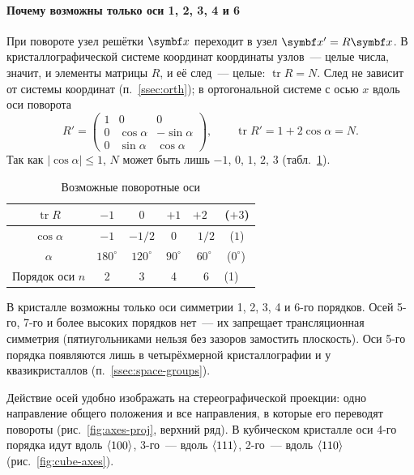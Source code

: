 \paragraph{Почему возможны только оси 1, 2, 3, 4 и 6}
При повороте узел решётки $\vb x$ переходит в узел $\vb x'=R\vb x$. В
кристаллографической системе координат координаты узлов~— целые числа,
значит, и элементы матрицы $R$, и её след~— целые: $\operatorname{tr}R=N$. След не
зависит от системы координат (п.~\ref{ssec:orth}); в ортогональной системе
с осью $x$ вдоль оси поворота
\begin{equation}\label{eq:Rx}
R'=\begin{pmatrix}1&0&0\\0&\cos\alpha&-\sin\alpha\\0&\sin\alpha&\cos\alpha\end{pmatrix},\qquad
\operatorname{tr}R'=1+2\cos\alpha=N .
\end{equation}
Так как $|\cos\alpha|\le1$, $N$ может быть лишь $-1$, $0$, $1$, $2$, $3$
(табл.~\ref{tab:axes}).

\begin{table}[ht]
\centering
\caption{Возможные поворотные оси}\label{tab:axes}
\small
\begin{tabular}{@{}ccccc@{}}
\toprule
$\operatorname{tr}R$ & $-1$ & $0$ & $+1$ & $+2$ \ \ ($+3$) \\
\midrule
$\cos\alpha$ & $-1$ & $-1/2$ & $0$ & $1/2$ \ \ ($1$) \\
$\alpha$ & $180^\circ$ & $120^\circ$ & $90^\circ$ & $60^\circ$ \ \ ($0^\circ$) \\
Порядок оси $n$ & 2 & 3 & 4 & 6 \ \ (1) \\
\bottomrule
\end{tabular}
\end{table}

\begin{glavnoe}
В кристалле возможны только оси симметрии 1, 2, 3, 4 и 6-го порядков.
Осей 5-го, 7-го и более высоких порядков нет~— их запрещает
трансляционная симметрия (пятиугольниками нельзя без зазоров замостить
плоскость). Оси 5-го порядка появляются лишь в четырёхмерной
кристаллографии и у квазикристаллов (п.~\ref{ssec:space-groups}).
\end{glavnoe}

Действие осей удобно изображать на стереографической проекции: одно
направление общего положения и все направления, в которые его
переводят повороты (рис.~\ref{fig:axes-proj}, верхний ряд). В кубическом
кристалле оси 4-го порядка идут вдоль $\langle 100\rangle$, 3-го~— вдоль
$\langle 111\rangle$, 2-го~— вдоль $\langle 110\rangle$ (рис.~\ref{fig:cube-axes}).

